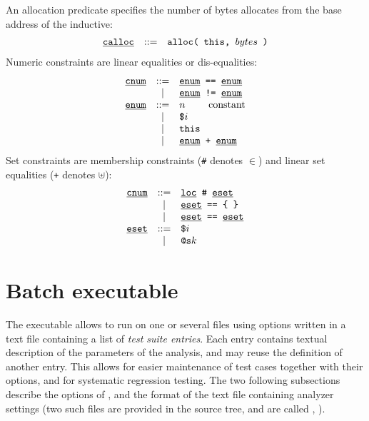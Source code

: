 An allocation predicate specifies the number of bytes allocates from
the base address of the inductive:
\[
\begin{array}{rcl}
  \underline{\smash{\texttt{calloc}}}
  & ::=
  & \texttt{alloc( this, } bytes \texttt{ )}
  \\
\end{array}
\]
Numeric constraints are linear equalities or dis-equalities:
\[
\begin{array}{rcl}
  \underline{\smash{\texttt{cnum}}}
  & ::=
  & \underline{\smash{\texttt{enum}}} \texttt{ == } \underline{\smash{\texttt{enum}}}
  \\
  & |
  & \underline{\smash{\texttt{enum}}} \texttt{ != } \underline{\smash{\texttt{enum}}}
  \\
  \underline{\smash{\texttt{enum}}}
  & ::=
  & n \qquad \text{ constant}
  \\
  & |
  & \texttt{\$}i
  \\
  & |
  & \texttt{this}
  \\
  & |
  & \underline{\smash{\texttt{enum}}} \texttt{ + } \underline{\smash{\texttt{enum}}}
  \\
\end{array}
\]
Set constraints are membership constraints (\texttt{\#} denotes \( \in \))
and linear set equalities (\texttt{+} denotes \( \uplus \)):
\[
\begin{array}{rcl}
  \underline{\smash{\texttt{cnum}}}
  & ::=
  & \underline{\smash{\texttt{loc}}} \texttt{ \# } \underline{\smash{\texttt{eset}}}
  \\
  & |
  & \underline{\smash{\texttt{eset}}} \texttt{ == \{ \}}
  \\
  & |
  & \underline{\smash{\texttt{eset}}} \texttt{ == } \underline{\smash{\texttt{eset}}}
  \\
  \underline{\smash{\texttt{eset}}}
  & ::=
  & \texttt{\$}i
  \\
  & |
  & \texttt{@s}k
  \\
\end{array}
\]


\section{Batch executable}
\label{s:3:4:batch}
The \sbatch executable allows to run \sanalyze on one or several files
using options written in a text file containing a list of {\em test
  suite entries}.
Each entry contains textual description of the parameters of the
analysis, and may reuse the definition of another entry.
This allows for easier maintenance of test cases together with their
options, and for systematic regression testing.
The two following subsections describe the options of \sbatch, and the
format of the text file containing analyzer settings (two such files
are provided in the source tree, and are called ,
).

